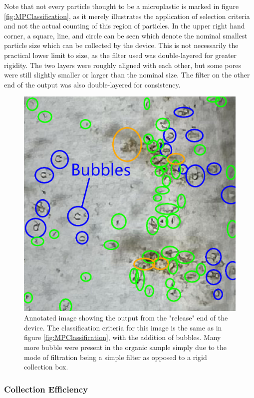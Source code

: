 \documentclass[fleqn,10pt]{SelfArx} %
\begin{document}
	Note that not every particle thought to be a microplastic is marked in figure \ref{fig:MPClassification}, as it merely illustrates the application of selection criteria and not the actual counting of this region of particles. In the upper right hand corner, a square, line, and circle can be seen which denote the nominal smallest particle size which can be collected by the device. This is not necessarily the practical lower limit to size, as the filter used was double-layered for greater rigidity. The two layers were roughly aligned with each other, but some pores were still slightly smaller or larger than the nominal size. The filter on the other end of the output was also double-layered for consistency.
		\begin{figure}[h]
		\centering
		\includegraphics[width=1\linewidth]{Figures/OrganicsBox}
		\caption[Annotated Collected Organics]{Annotated image showing the output from the "release" end of the device. The classification criteria for this image is the same as in figure \ref{fig:MPClassification}, with the addition of bubbles. Many more bubble were present in the organic sample simply due to the mode of filtration being a simple filter as opposed to a rigid collection box.}
		\label{fig:OrganicsOutput}
	\end{figure}
	\fi
	\subsubsection{Collection Efficiency}
	
\end{document}
